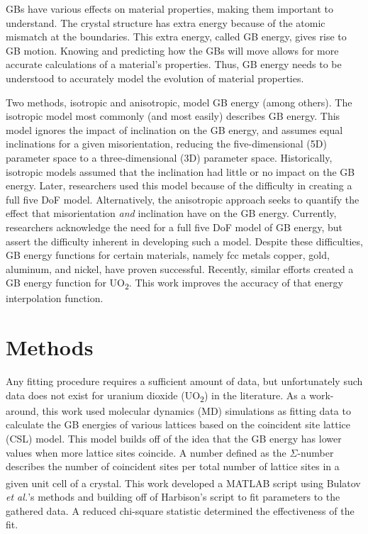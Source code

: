 \documentclass[twoside,senior]{BYUPhys}
\begin{document}
GBs have various effects on material properties, making them important to understand.\cite{patala2013, homer2015, bulatov2014}  The crystal structure has extra energy because of the atomic mismatch at the boundaries.  This extra energy, called GB energy, gives rise to GB motion.  Knowing and predicting how the GBs will move allows for more accurate calculations of a material's properties.  Thus, GB energy needs to be understood to accurately model the evolution of material properties.

Two methods, isotropic and anisotropic, model GB energy (among others).  The isotropic model most commonly (and most easily) describes GB energy.  This model ignores the impact of inclination on the GB energy, and assumes equal inclinations for a given misorientation, reducing the five-dimensional (5D) parameter space to a three-dimensional (3D) parameter space.  Historically, isotropic models assumed that the inclination had little or no impact on the GB energy.  Later, researchers used this model because of the difficulty in creating a full five DoF model.\cite{homer2015}  Alternatively, the anisotropic approach seeks to quantify the effect that misorientation \emph{and} inclination have on the GB energy.  Currently, researchers acknowledge the need for a full five DoF model of GB energy, but assert the difficulty inherent in developing such a model.\cite{rohrer2011, lejcek2010, homer2015}  Despite these difficulties, GB energy functions for certain materials, namely fcc metals copper, gold, aluminum, and nickel, have proven successful.\cite{bulatov2014} Recently,\cite{harbison2015} similar efforts created a GB energy function for UO\textsubscript{2}.  This work improves the accuracy of that energy interpolation function.

\chapter{Methods\label{methods}}
Any fitting procedure requires a sufficient amount of data, but unfortunately such data does not exist for uranium dioxide (UO\textsubscript{2}) in the literature.  As a work-around, this work used molecular dynamics (MD) simulations\cite{zhang2016,hansen2016} as fitting data to calculate the GB energies of various lattices based on the coincident site lattice (CSL) model. This model builds off of the idea that the GB energy has lower values when more lattice sites coincide.  A number defined as the $\Sigma$-number describes the number of coincident sites per total number of lattice sites in a given unit cell of a crystal.\cite{lejcek2010, rohrer2011} This work developed a MATLAB\textsuperscript{\textregistered} script using Bulatov \emph{et al.}'s methods\cite{bulatov2014} and building off of Harbison's script\cite{harbison2015} to fit parameters to the gathered data.  A reduced chi-square statistic determined the effectiveness of the fit.
\end{document}
